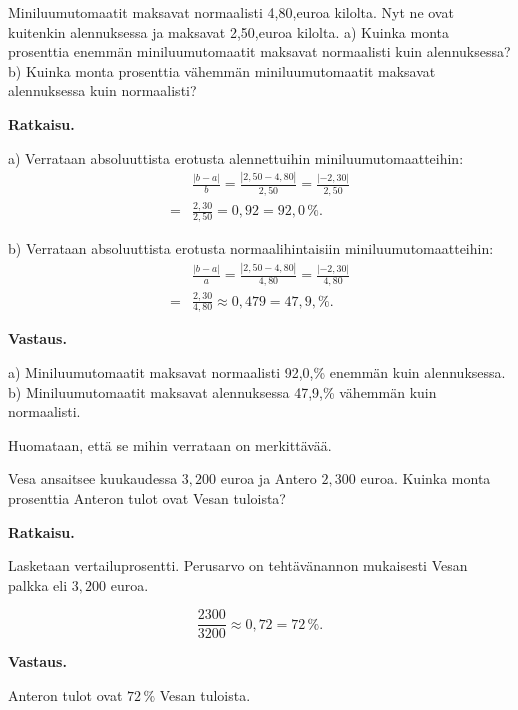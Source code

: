 \begin{esimerkki}
    Miniluumutomaatit maksavat normaalisti 4,80,euroa kilolta. Nyt ne ovat kuitenkin alennuksessa ja maksavat 2,50,euroa kilolta.
     \newline a) Kuinka monta prosenttia enemmän miniluumutomaatit maksavat normaalisti kuin alennuksessa?
     \newline b) Kuinka monta prosenttia vähemmän miniluumutomaatit maksavat alennuksessa kuin normaalisti?
     
     \textbf{Ratkaisu.}
     
a) Verrataan absoluuttista erotusta alennettuihin miniluumutomaatteihin:
\begin{align*}
     &\frac{|b-a|}{b}  = \frac{|2,50-4,80|}{2,50} = \frac{|-2,30|}{2,50} \\
     = &\frac{2,30}{2,50}  = 0,92 = 92,0\,\%.
\end{align*}
    
    
b) Verrataan absoluuttista erotusta normaalihintaisiin miniluumutomaatteihin:
\begin{align*}
     &\frac{|b-a|}{a} = \frac{|2,50-4,80|}{4,80} = \frac{|-2,30|}{4,80} \\
     = &\frac{2,30}{4,80}  \approx 0,479  = 47,9,\%.
\end{align*}

     \textbf{Vastaus.}
     
     a) Miniluumutomaatit maksavat normaalisti 92,0,\% enemmän kuin alennuksessa.
     \newline b) Miniluumutomaatit maksavat alennuksessa 47,9,\% vähemmän kuin normaalisti.
     
     Huomataan, että se mihin verrataan on merkittävää.
     \end{esimerkki}
    

\begin{esimerkki}
    Vesa ansaitsee kuukaudessa ${3,200}$ euroa ja Antero ${2,300}$ euroa.
    Kuinka monta prosenttia Anteron tulot ovat Vesan tuloista? 
    
    \textbf{Ratkaisu.}
    
    Lasketaan vertailuprosentti. Perusarvo on tehtävänannon mukaisesti
    Vesan palkka eli ${3,200}$ euroa.
    
    \[
        \frac{2300}{3200} 
        \approx 0,72
        = 72\,\%.
    \]
    
    \textbf{Vastaus.}
    
    Anteron tulot ovat $72\,\%$ Vesan tuloista.
\end{esimerkki}

